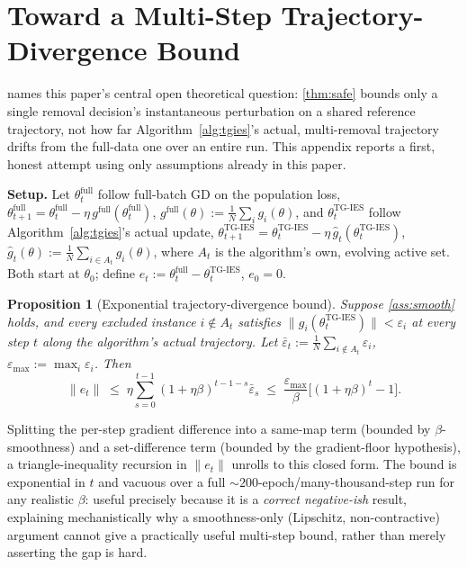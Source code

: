 \documentclass{article}
\theoremstyle{plain}
\newtheorem{proposition}[theorem]{Proposition}
\theoremstyle{definition}
\theoremstyle{remark}
\begin{document}
\section{Toward a Multi-Step Trajectory-Divergence Bound}
\label{app:multistep}

 names this paper's central open theoretical question: \cref{thm:safe} bounds only a single removal decision's instantaneous perturbation on a shared reference trajectory, not how far Algorithm~\ref{alg:tgies}'s actual, multi-removal trajectory drifts from the full-data one over an entire run. This appendix reports a first, honest attempt using only assumptions already in this paper.

\textbf{Setup.} Let $\theta_t^{\mathrm{full}}$ follow full-batch GD on the population loss, $\theta_{t+1}^{\mathrm{full}} = \theta_t^{\mathrm{full}} - \eta\, g^{\mathrm{full}}(\theta_t^{\mathrm{full}})$, $g^{\mathrm{full}}(\theta) := \frac1N\sum_i g_i(\theta)$, and $\theta_t^{\mathrm{TG\text{-}IES}}$ follow Algorithm~\ref{alg:tgies}'s actual update, $\theta_{t+1}^{\mathrm{TG\text{-}IES}} = \theta_t^{\mathrm{TG\text{-}IES}} - \eta\, \hat g_t(\theta_t^{\mathrm{TG\text{-}IES}})$, $\hat g_t(\theta) := \frac1N\sum_{i\in A_t}g_i(\theta)$, where $A_t$ is the algorithm's own, evolving active set. Both start at $\theta_0$; define $e_t := \theta_t^{\mathrm{full}} - \theta_t^{\mathrm{TG\text{-}IES}}$, $e_0=0$.

\begin{proposition}[Exponential trajectory-divergence bound]
\label{prop:multistep}
Suppose \cref{ass:smooth} holds, and every excluded instance $i\notin A_t$ satisfies $\|g_i(\theta_t^{\mathrm{TG\text{-}IES}})\| < \varepsilon_i$ at every step $t$ along the algorithm's actual trajectory. Let $\bar\varepsilon_t := \frac1N\sum_{i\notin A_t}\varepsilon_i$, $\varepsilon_{\max} := \max_i \varepsilon_i$. Then
\begin{equation}
\label{eq:multistep}
\|e_t\| \;\le\; \eta\sum_{s=0}^{t-1}(1+\eta\beta)^{t-1-s}\bar\varepsilon_s \;\le\; \frac{\varepsilon_{\max}}{\beta}\Big[(1+\eta\beta)^t - 1\Big].
\end{equation}
\end{proposition}

Splitting the per-step gradient difference into a same-map term (bounded by $\beta$-smoothness) and a set-difference term (bounded by the gradient-floor hypothesis), a triangle-inequality recursion in $\|e_t\|$ unrolls to this closed form. The bound is exponential in $t$ and vacuous over a full $\sim\!200$-epoch/many-thousand-step run for any realistic $\beta$: useful precisely because it is a \emph{correct negative-ish} result, explaining mechanistically why a smoothness-only (Lipschitz, non-contractive) argument cannot give a practically useful multi-step bound, rather than merely asserting the gap is hard.
\end{document}
